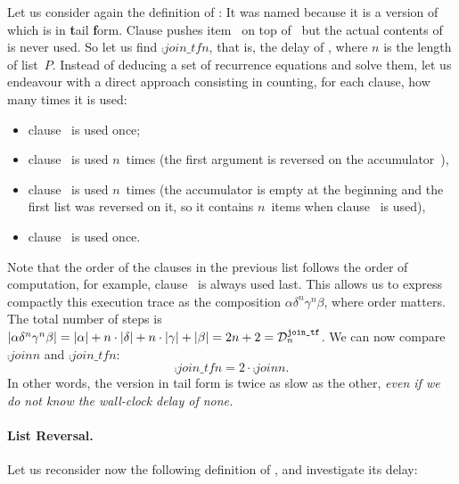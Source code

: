 Let us consider again the definition of 
:  It was named
 because it is a version of  which is
in \textbf{t}ail \textbf{f}orm. Clause \clause{\gamma} pushes
item~ on top of~ but the actual contents
of~ is never used. So let us find \(\comp{join\_tf}{n}\),
that is, the delay of , where \(n\) is
the length of list~\(P\). Instead of deducing a set of recurrence
equations and solve them, let us endeavour with a direct approach
consisting in counting, for each clause, how many times it is used:
\begin{itemize}

  \item clause~\clause{\alpha} is used once;

  \item clause~\clause{\delta} is used \(n\)~times (the first argument
    is reversed on the accumulator~),

  \item clause~\clause{\gamma} is used \(n\)~times (the accumulator is
    empty at the beginning and the first list was reversed on it, so
    it contains \(n\)~items when clause~\clause{\eta} is used),

  \item clause~\clause{\beta} is used once.

\end{itemize}
Note that the order of the clauses in the previous list follows the
order of computation, for example, clause~\clause{\beta} is always
used last. This allows us to express compactly this execution trace as
the composition \(\alpha\delta^n\gamma^n\beta\), where order
matters. The total number of steps is
\(\abs{\alpha\delta^n\gamma^n\beta} = \abs{\alpha} + n \cdot
\abs{\delta} + n \cdot \abs{\gamma} + \abs{\beta} = 2n + 2 =
\comp{join\_tf}{n}\). We can now compare \(\comp{join}{n}\) and
\(\comp{join\_tf}{n}\):
\[
\comp{join\_tf}{n} = 2 \cdot \comp{join}{n}.
\]
In other words, the version in tail form is twice as slow as the
other, \emph{even if we do not know the wall\hyp{}clock delay of
  none.}

\medskip

\paragraph{List Reversal.}

Let us reconsider now the following definition of ,
and investigate its delay:

